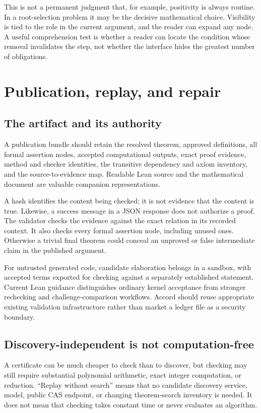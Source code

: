 \documentclass[11pt,letterpaper]{article}
\theoremstyle{definition}
\begin{document}
This is not a permanent judgment that, for example, positivity is always routine.
In a root-selection problem it may be the decisive mathematical choice. Visibility
is tied to the role in the current argument, and the reader can expand any node.
A useful comprehension test is whether a reader can locate the condition whose
removal invalidates the step, not whether the interface hides the greatest number
of obligations.

\section{Publication, replay, and repair}\label{sec:replay}
\subsection{The artifact and its authority}
A publication bundle should retain the resolved theorem, approved definitions,
all formal assertion nodes, accepted computational outputs, exact proof evidence,
method and checker identities, the transitive dependency and axiom inventory,
and the source-to-evidence map. Readable Lean source and the mathematical document
are valuable companion representations.

A hash identifies the content being checked; it is not evidence that the content
is true. Likewise, a success message in a JSON response does not authorize a proof.
The validator checks the evidence against the exact relation in its recorded
context. It also checks every formal assertion node, including unused ones.
Otherwise a trivial final theorem could conceal an unproved or false intermediate
claim in the published argument.

For untrusted generated code, candidate elaboration belongs in a sandbox, with
accepted terms exported for checking against a separately established statement.
Current Lean guidance distinguishes ordinary kernel acceptance from stronger
rechecking and challenge-comparison workflows\cite{leanvalidation}. Accord should
reuse appropriate existing validation infrastructure rather than market a ledger
file as a security boundary.

\subsection{Discovery-independent is not computation-free}
A certificate can be much cheaper to check than to discover, but checking may still
require substantial polynomial arithmetic, exact integer computation, or reduction.
``Replay without search'' means that no candidate discovery service, model, public
CAS endpoint, or changing theorem-search inventory is needed. It does not mean
that checking takes constant time or never evaluates an algorithm.
\end{document}
